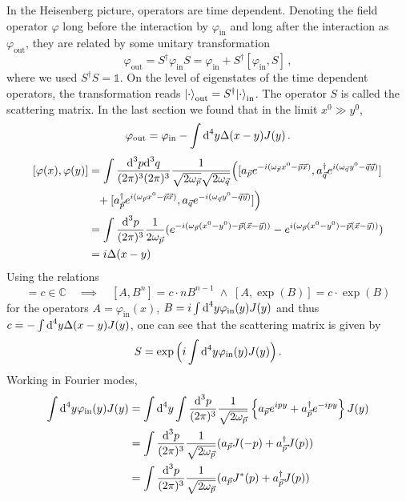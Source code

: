 In the Heisenberg picture, operators are time dependent. Denoting the field operator $\varphi$ long before the interaction by $\varphi_{\text{in}}$ and long after the interaction as $\varphi_{\text{out}}$, they are related by some unitary transformation
\begin{equation}
    \varphi_{\text{out}}=S^\dagger \varphi_{\text{in}}S=\varphi_{\text{in}}+S^\dagger[\varphi_{\text{in}},S]\,,
\end{equation}
where we used ${S^\dagger S=\mathbb{1}}$. On the level of eigenstates of the time dependent operators, the transformation reads ${{\lvert\cdot\rangle}_{\text{out}}=S^\dagger{\lvert\cdot\rangle}_{\text{in}}}$. The operator $S$ is called the scattering matrix. In the last section we found that in the limit ${x^0\gg y^0}$,
\begin{equation}
    \varphi_{\text{out}}=\varphi_{\text{in}}-\int\text{d}^4y\Delta(x-y)J(y)\,.
\end{equation}
\begin{subequations}
    \begin{align}
        [\varphi(x),\varphi(y)]&=\int\frac{\text{d}^3p\text{d}^3q}{(2\pi)^3(2\pi)^3}\frac{1}{\sqrt{2\omega_{\vec{p}}}\sqrt{2\omega_{\vec{q}}}}\Big([a_{\vec{p}}e^{-{i}(\omega_{\vec{p}}x^0-\vec{p}\vec{x})},a_{\vec{q}}^\dagger e^{{i}(\omega_{\vec{q}}y^0-\vec{q}\vec{y})}]\\
        &\phantom{=}+[a_{\vec{p}}^\dagger e^{{i}(\omega_{\vec{p}}x^0-\vec{p}\vec{x})},a_{\vec{q}} e^{-{i}(\omega_{\vec{q}}y^0-\vec{q}\vec{y})}]\Big)\\
        &=\int\frac{\text{d}^3p}{(2\pi)^3}\frac{1}{2\omega_{\vec{p}}}(e^{-{i}(\omega_{\vec{p}}(x^0-y^0)-\vec{p}(\vec{x}-\vec{y}))}-e^{{i}(\omega_{\vec{p}}(x^0-y^0)-\vec{p}(\vec{x}-\vec{y}))})\\
        &={i}\Delta(x-y)
    \end{align}
\end{subequations}
Using the relations
\begin{equation}
    [A,B]=c\in\mathbb{C}\quad\implies\quad[A,B^n]=c\cdot nB^{n-1}\;\wedge\;[A,\exp(B)]=c\cdot\exp(B)
\end{equation}
for the operators ${A=\varphi_{\text{in}}(x)}$, ${B={i}\int\text{d}^4y\varphi_{\text{in}}(y)J(y)}$ and thus ${c=-\int\text{d}^4y\Delta(x-y)J(y)}$, one can see that the scattering matrix is given by
\begin{equation}
    S=\exp\Big({i}\int\text{d}^4y\varphi_{\text{in}}(y)J(y)\Big)\,.
\end{equation}
Working in Fourier modes,
\begin{align}
    \int\text{d}^4y\varphi_{\text{in}}(y)J(y)&=\int\text{d}^4y\int\frac{\text{d} ^3p}{(2\pi)^3}\frac{1}{\sqrt{2\omega_{\vec{p}}}}\left\{a_{\vec{p}}e^{{i} py}+a_{\vec{p}}^\dagger e^{-{i} py}\right\}J(y)\\
    &=\int\frac{\text{d} ^3p}{(2\pi)^3}\frac{1}{\sqrt{2\omega_{\vec{p}}}}(a_{\vec{p}}J(-p)+a_{\vec{p}}^\dagger J(p))\\
    &=\int\frac{\text{d} ^3p}{(2\pi)^3}\frac{1}{\sqrt{2\omega_{\vec{p}}}}(a_{\vec{p}}J^*(p)+a_{\vec{p}}^\dagger J(p))
\end{align}

